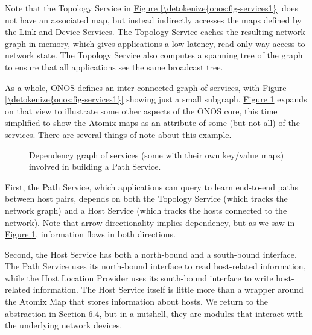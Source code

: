 \documentclass[letterpaper,11pt,english]{sphinxmanual}
\let\sphinxpxdimen\pdfpxdimen\else\newdimen\sphinxpxdimen
\begin{document}
Note that the Topology Service in \hyperref[\detokenize{onos:fig-services1}]{Figure \ref{\detokenize{onos:fig-services1}}}
does not have an associated map, but instead indirectly accesses the
maps defined by the Link and Device Services. The Topology Service
caches the resulting network graph in memory, which gives applications
a low-latency, read-only way access to network state. The Topology
Service also computes a spanning tree of the graph to ensure that all
applications see the same broadcast tree.

As a whole, ONOS defines an inter-connected graph of services, with
\hyperref[\detokenize{onos:fig-services1}]{Figure \ref{\detokenize{onos:fig-services1}}} showing just a small
subgraph. \hyperref[\detokenize{onos:fig-services2}]{Figure \ref{\detokenize{onos:fig-services2}}} expands on that view to
illustrate some other aspects of the ONOS core, this time simplified
to show the Atomix maps as an attribute of some (but not all) of the
services. There are several things of note about this example.

\begin{figure}[htbp]
\centering
\capstart

\noindent\sphinxincludegraphics[width=550\sphinxpxdimen]{{Slide33}.png}
\caption{Dependency graph of services (some with their own key/value maps)
involved in building a Path Service.}\label{\detokenize{onos:id9}}\label{\detokenize{onos:fig-services2}}\end{figure}

First, the Path Service, which applications can query to learn
end-to-end paths between host pairs, depends on both the Topology
Service (which tracks the network graph) and a Host Service (which
tracks the hosts connected to the network). Note that arrow
directionality implies dependency, but as we saw in \hyperref[\detokenize{onos:fig-services2}]{Figure \ref{\detokenize{onos:fig-services2}}}, information flows in both directions.

Second, the Host Service has both a north-bound and a south-bound
interface. The Path Service uses its north-bound interface to read
host-related information, while the Host Location Provider uses its
south-bound interface to write host-related information. The Host
Service itself is little more than a wrapper around the Atomix Map
that stores information about hosts. We return to the 
abstraction in Section 6.4, but in a nutshell, they are modules that
interact with the underlying network devices.
\end{document}
